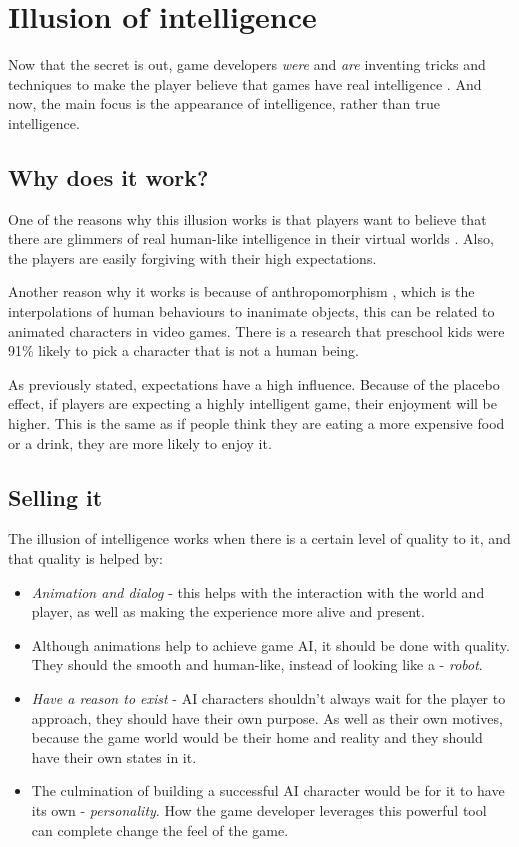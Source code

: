 \documentclass[a4paper, 12pt]{book}
\begin{document}
\section{Illusion of intelligence}
Now that the secret is out, game developers \emph{were} and \emph{are} inventing tricks and techniques to make the player believe that games have real intelligence \cite{IllusionOfIntelligece}. And now, the main focus is the appearance of intelligence, rather than true intelligence.

\subsection{Why does it work?}
One of the reasons why this illusion works is that players want to believe that there are glimmers of real human-like intelligence in their virtual worlds \cite{IllusionOfIntelligece}. Also, the players are easily forgiving with their high expectations.

Another reason why it works is because of anthropomorphism \cite{AnthropomorphicCharacters}, which is the interpolations of human behaviours to inanimate objects, this can be related to animated characters in video games. There is a research that preschool kids were 91\% likely to pick a character that is not a human being.

As previously stated, expectations have a high influence. Because of the placebo effect, if players are expecting a highly intelligent game, their enjoyment will be higher. This is the same as if people think they are eating a more expensive food or a drink, they are more likely to enjoy it.

\subsection{Selling it}
The illusion of intelligence \cite{IllusionOfIntelligece} works when there is a certain level of quality to it, and that quality is helped by:
\begin{itemize}
    \item \emph{Animation and dialog} - this helps with the interaction with the world and player, as well as making the experience more alive and present.
    \item Although animations help to achieve game AI, it should be done with quality. They should the smooth and human-like, instead of looking like a - \emph{robot}.
    \item \emph{Have a reason to exist} - AI characters shouldn't always wait for the player to approach, they should have their own purpose. As well as their own motives, because the game world would be their home and reality and they should have their own states in it.
    \item The culmination of building a successful AI character would be for it to have its own - \emph{personality}. How the game developer leverages this powerful tool can complete change the feel of the game.
\end{itemize}
\end{document}
